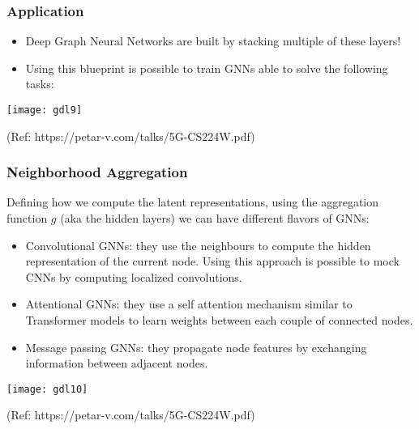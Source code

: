 \begin{frame}[fragile]\frametitle{Application}


\begin{itemize}
\item Deep Graph Neural Networks are built by stacking multiple of these layers!
\item Using this blueprint is possible to train GNNs able to solve the following tasks:
\end{itemize}
	
\begin{center}
\texttt{[image: gdl9]}
\end{center}

{\tiny (Ref: https://petar-v.com/talks/5G-CS224W.pdf)}	

\end{frame}


\begin{frame}[fragile]\frametitle{Neighborhood Aggregation}

Defining how we compute the latent representations, using the aggregation function $g$ (aka the hidden layers) we can have different flavors of GNNs:

\begin{itemize}
\item Convolutional GNNs: they use the neighbours to compute the hidden representation of the current node. Using this approach is possible to mock CNNs by computing localized convolutions.
\item Attentional GNNs: they use a self attention mechanism similar to Transformer models to learn weights between each couple of connected nodes.
\item Message passing GNNs: they propagate node features by exchanging information between adjacent nodes.
\end{itemize}
	
\begin{center}
\texttt{[image: gdl10]}
\end{center}

{\tiny (Ref: https://petar-v.com/talks/5G-CS224W.pdf)}	

\end{frame}


